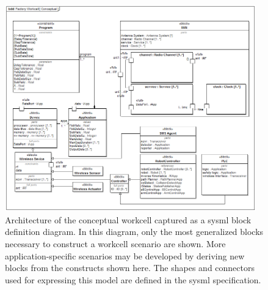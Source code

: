 \begin{figure}
	
	\centering
	\includegraphics[width=0.97\textwidth]{./chapter-sysml/diagrams/bdd__Factory_Workcell__Conceptual}
	\caption{Architecture of the conceptual workcell captured as a \gls{sysml} block definition diagram.  In this diagram, only the most generalized blocks necessary to construct a workcell scenario are shown.  More application-specific scenarios may be developed by deriving new blocks from the constructs shown here. The shapes and connectors used for expressing this model are defined in the \gls{sysml} specification\cite{SysML2017}. }
	\label{sysml:fig:conceptual:bdd}
	
\end{figure}

